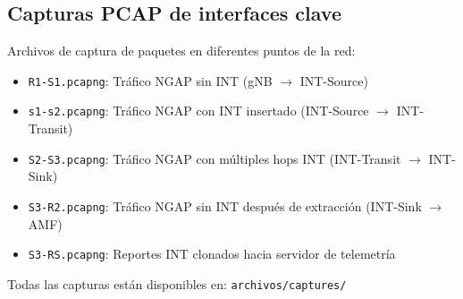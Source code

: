 \subsection{Capturas PCAP de interfaces clave}
Archivos de captura de paquetes en diferentes puntos de la red:
\begin{itemize}
    \item \texttt{R1-S1.pcapng}: Tráfico NGAP sin INT (gNB $\rightarrow$ INT-Source)
    \item \texttt{s1-s2.pcapng}: Tráfico NGAP con INT insertado (INT-Source $\rightarrow$ INT-Transit)
    \item \texttt{S2-S3.pcapng}: Tráfico NGAP con múltiples hops INT (INT-Transit $\rightarrow$ INT-Sink)
    \item \texttt{S3-R2.pcapng}: Tráfico NGAP sin INT después de extracción (INT-Sink $\rightarrow$ AMF)
    \item \texttt{S3-RS.pcapng}: Reportes INT clonados hacia servidor de telemetría
\end{itemize}

Todas las capturas están disponibles en: \texttt{archivos/captures/}
